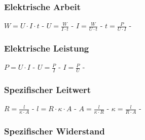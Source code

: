 \subsubsection{Elektrische Arbeit} 
\begin{minipage}{0.45\textwidth} 
\end{minipage} 
\begin{minipage}{0.45\textwidth} 
 
\legende{}\end{minipage} 
 
$ W = U\cdot I\cdot t $ - $ U = \frac{W}{I\cdot t} $ - $ I = \frac{W}{U\cdot t} $ - $ t = \frac{ P}{U\cdot I} $ - \\ 
 
\subsubsection{Elektrische Leistung} 
\begin{minipage}{0.45\textwidth} 
\end{minipage} 
\begin{minipage}{0.45\textwidth} 
 
\legende{}\end{minipage} 
 
$ P = U\cdot I $ - $ U = \frac{P}{I} $ - $ I = \frac{P}{U} $ - \\ 
 
\subsubsection{Spezifischer Leitwert} 
\begin{minipage}{0.45\textwidth} 
\end{minipage} 
\begin{minipage}{0.45\textwidth} 
 
\legende{}\end{minipage} 
 
$ R = \frac{ l}{\kappa \cdot A} $ - $ l = R\cdot \kappa \cdot A $ - $ A = \frac{l}{\kappa \cdot R} $ - $ \kappa  = \frac{ l}{R\cdot A} $ - \\ 
 
\subsubsection{Spezifischer Widerstand} 
\begin{minipage}{0.45\textwidth} 
\end{minipage} 
\begin{minipage}{0.45\textwidth} 
 
\legende{}\end{minipage} 
 
